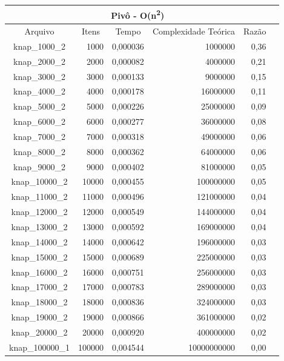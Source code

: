 \documentclass[
	12pt,				%
	oneside,			%
	a4paper,			%
	english,			%
	french,				%
	spanish,			%
	brazil,				%
	]{abntex2}
\begin{document}
\begin{longtable}{|c|r|r|r|r|r|}
\toprule
\multicolumn{5}{|c|}{\cellcolor{gray!25}\textbf{Pivô - O(n\textsuperscript{2})}}\\
\midrule
\multicolumn{1}{|c|}{\cellcolor{gray!10}Arquivo} & \multicolumn{1}{|c|}{\cellcolor{gray!10}Itens} &  \multicolumn{1}{|c|}{\cellcolor{gray!10}Tempo} &
\multicolumn{1}{|c|}{\cellcolor{gray!10}Complexidade Teórica} &
\multicolumn{1}{|c|}{\cellcolor{gray!10}Razão}\\ \hline
\hline
knap\_1000\_2	&	1000	&	0,000036	&	1000000	&	0,36	 \\ \hline
knap\_2000\_2	&	2000	&	0,000082	&	4000000	&	0,21	 \\ \hline
knap\_3000\_2	&	3000	&	0,000133	&	9000000	&	0,15	 \\ \hline
knap\_4000\_2	&	4000	&	0,000178	&	16000000	&	0,11	 \\ \hline
knap\_5000\_2	&	5000	&	0,000226	&	25000000	&	0,09	 \\ \hline
knap\_6000\_2	&	6000	&	0,000277	&	36000000	&	0,08	 \\ \hline
knap\_7000\_2	&	7000	&	0,000318	&	49000000	&	0,06	 \\ \hline
knap\_8000\_2	&	8000	&	0,000362	&	64000000	&	0,06	 \\ \hline
knap\_9000\_2	&	9000	&	0,000402	&	81000000	&	0,05	 \\ \hline
knap\_10000\_2	&	10000	&	0,000455	&	100000000	&	0,05	 \\ \hline
knap\_11000\_2	&	11000	&	0,000496	&	121000000	&	0,04	 \\ \hline
knap\_12000\_2	&	12000	&	0,000549	&	144000000	&	0,04	 \\ \hline
knap\_13000\_2	&	13000	&	0,000592	&	169000000	&	0,04	 \\ \hline
knap\_14000\_2	&	14000	&	0,000642	&	196000000	&	0,03	 \\ \hline
knap\_15000\_2	&	15000	&	0,000689	&	225000000	&	0,03	 \\ \hline
knap\_16000\_2	&	16000	&	0,000751	&	256000000	&	0,03	 \\ \hline
knap\_17000\_2	&	17000	&	0,000783	&	289000000	&	0,03	 \\ \hline
knap\_18000\_2	&	18000	&	0,000836	&	324000000	&	0,03	 \\ \hline
knap\_19000\_2	&	19000	&	0,000866	&	361000000	&	0,02	 \\ \hline
knap\_20000\_2	&	20000	&	0,000920	&	400000000	&	0,02	 \\ \hline
knap\_100000\_1	&	100000	&	0,004544	&	10000000000	&	0,00	 \\ \hline
\end{longtable}
\end{document}
